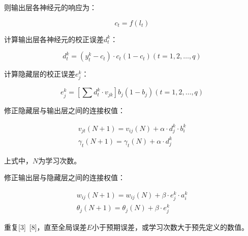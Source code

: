 \documentclass[UTF8]{ctexart}
\begin{document}
则输出层各神经元的响应为： \par
\begin{equation}
c_t=f\left( l_t \right) 
\end{equation}\par
[5]计算输出层各神经元的校正误差$d_t^k$： \par
\begin{equation}
d_{t}^{k}=\left( y_{t}^{k}-c_t \right) \cdot c_t\left( 1-c_t \right) \left( t=1,2,…,q \right) 
\end{equation}\par
[6]计算隐藏层的校正误差$e_j^k$：\par
\begin{equation}
e_{j}^{k}=\left[ \sum{d_{t}^{k}\cdot v_{jk}} \right] b_j\left( 1-b_j \right) \left( t=1,2,…,q \right) 
\end{equation}\par
[7]修正隐藏层与输出层之间的连接权值： \par
	\begin{equation}
	\begin{aligned}
v_{jt}\left( N+1 \right) =v_{ij}\left( N \right) +\alpha \cdot d_{j}^{k}\cdot b_{i}^{k}
\\
\gamma _t\left( N+1 \right) =\gamma _t\left( N \right) +\alpha \cdot d_{j}^{k}
		\end{aligned}
\end{equation}\par 
上式中，$N$为学习次数。\par
[8]修正输出层与隐藏层之间的连接权值： \par
	\begin{equation}
	\begin{aligned}
		w_{ij}\left( N+1 \right) =w_{ij}\left( N \right) +\beta \cdot e_{j}^{k}\cdot a_{i}^{k}
		\\
		\theta _j\left( N+1 \right) =\theta _j\left( N \right) +\beta \cdot e_{j}^{k}
	\end{aligned}
\end{equation}\par 
[9]重复[3]~[8]，直至全局误差$E$小于预期误差，或学习次数大于预先定义的数值。 \par
\end{document}
